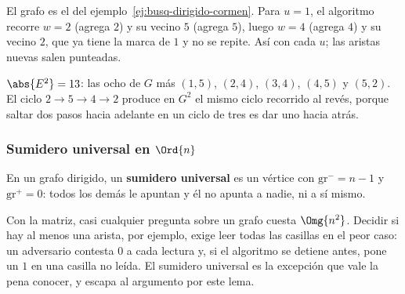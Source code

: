 \documentclass[11pt,letterpaper]{article}
\begin{document}
\begin{ejemplo}
  El grafo es el del ejemplo~\ref{ej:busq-dirigido-cormen}. Para
  $u = 1$, el algoritmo recorre $w = 2$ (agrega $2$) y su vecino $5$
  (agrega $5$), luego $w = 4$ (agrega $4$) y su vecino $2$, que ya
  tiene la marca de $1$ y no se repite. Así con cada $u$; las
  aristas nuevas salen punteadas.
  \begin{center}
  \end{center}
  $\abs{E^2} = 13$: las ocho de $G$ más $(1,5)$, $(2,4)$, $(3,4)$,
  $(4,5)$ y $(5,2)$. El ciclo $2 \to 5 \to 4 \to 2$ produce en
  $G^2$ el mismo ciclo recorrido al revés, porque saltar dos pasos
  hacia adelante en un ciclo de tres es dar uno hacia atrás.
\end{ejemplo}

\subsubsection*{Sumidero universal en $\Ord{n}$}

\begin{definicion}
  En un grafo dirigido, un \textbf{sumidero universal} es un vértice
  con $\text{gr}^{-} = n - 1$ y $\text{gr}^{+} = 0$: todos los demás
  le apuntan y él no apunta a nadie, ni a sí mismo.
\end{definicion}

Con la matriz, casi cualquier pregunta sobre un grafo cuesta
$\Omg{n^2}$. Decidir si hay al menos una arista, por ejemplo, exige
leer todas las casillas en el peor caso: un adversario contesta $0$ a
cada lectura y, si el algoritmo se detiene antes, pone un $1$ en una
casilla no leída. El sumidero universal es la excepción que vale la
pena conocer, y escapa al argumento por este lema.
\end{document}
